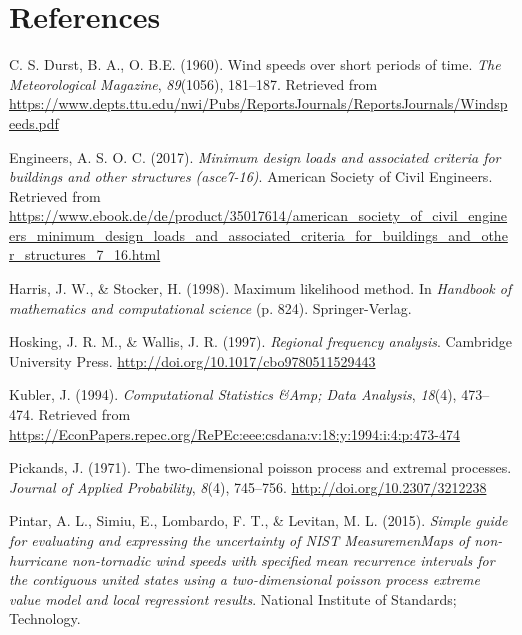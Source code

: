 \documentclass[12pt,twoside]{reedthesis}
\begin{document}
\backmatter

\hypertarget{references}{%
\chapter*{References}\label{references}}


\noindent

\setlength{\parindent}{-0.20in}
\setlength{\leftskip}{0.20in}
\setlength{\parskip}{8pt}

\hypertarget{refs}{}
\leavevmode\hypertarget{ref-Durst1960}{}%
C. S. Durst, B. A., O. B.E. (1960). Wind speeds over short periods of time. \emph{The Meteorological Magazine}, \emph{89}(1056), 181--187. Retrieved from \url{https://www.depts.ttu.edu/nwi/Pubs/ReportsJournals/ReportsJournals/Windspeeds.pdf}

\leavevmode\hypertarget{ref-Asce2017}{}%
Engineers, A. S. O. C. (2017). \emph{Minimum design loads and associated criteria for buildings and other structures (asce7-16)}. American Society of Civil Engineers. Retrieved from \url{https://www.ebook.de/de/product/35017614/american_society_of_civil_engineers_minimum_design_loads_and_associated_criteria_for_buildings_and_other_structures_7_16.html}

\leavevmode\hypertarget{ref-Harris1994}{}%
Harris, J. W., \& Stocker, H. (1998). Maximum likelihood method. In \emph{Handbook of mathematics and computational science} (p. 824). Springer-Verlag.

\leavevmode\hypertarget{ref-Hosking1997}{}%
Hosking, J. R. M., \& Wallis, J. R. (1997). \emph{Regional frequency analysis}. Cambridge University Press. \url{http://doi.org/10.1017/cbo9780511529443}

\leavevmode\hypertarget{ref-Kubler1994}{}%
Kubler, J. (1994). \emph{Computational Statistics \&Amp; Data Analysis}, \emph{18}(4), 473--474. Retrieved from \url{https://EconPapers.repec.org/RePEc:eee:csdana:v:18:y:1994:i:4:p:473-474}

\leavevmode\hypertarget{ref-Pickands1971}{}%
Pickands, J. (1971). The two-dimensional poisson process and extremal processes. \emph{Journal of Applied Probability}, \emph{8}(4), 745--756. \url{http://doi.org/10.2307/3212238}

\leavevmode\hypertarget{ref-Pintar2015}{}%
Pintar, A. L., Simiu, E., Lombardo, F. T., \& Levitan, M. L. (2015). \emph{Simple guide for evaluating and expressing the uncertainty of NIST MeasuremenMaps of non-hurricane non-tornadic wind speeds with specified mean recurrence intervals for the contiguous united states using a two-dimensional poisson process extreme value model and local regressiont results}. National Institute of Standards; Technology.
\end{document}
